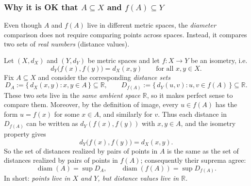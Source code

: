 
\subsubsection*{Why it is OK that $A\subseteq X$ and $f(A)\subseteq Y$}
Even though $A$ and $f(A)$ live in different metric spaces, the \emph{diameter}
comparison does not require comparing points across spaces.  Instead, it compares
two sets of \emph{real numbers} (distance values).

Let $(X,d_X)$ and $(Y,d_Y)$ be metric spaces and let $f:X\to Y$ be an isometry, i.e.
\[
d_Y\bigl(f(x),f(y)\bigr)=d_X(x,y)\qquad\text{for all }x,y\in X.
\]
Fix $A\subseteq X$ and consider the corresponding \emph{distance sets}
\[
D_A := \{\, d_X(x,y) : x,y\in A \,\}\subseteq \mathbb{R},
\qquad
D_{f(A)} := \{\, d_Y(u,v) : u,v\in f(A) \,\}\subseteq \mathbb{R}.
\]
These two sets live in the \emph{same ambient space} $\mathbb{R}$, so it makes
perfect sense to compare them. Moreover, by the definition of image,
every $u\in f(A)$ has the form $u=f(x)$ for some $x\in A$, and similarly for $v$.
Thus each distance in $D_{f(A)}$ can be written as $d_Y(f(x),f(y))$ with $x,y\in A$,
and the isometry property gives
\[
d_Y\bigl(f(x),f(y)\bigr)=d_X(x,y).
\]
So the set of distances realized by pairs of points in $A$ is the same as the set of
distances realized by pairs of points in $f(A)$; consequently their suprema agree:
\[
\operatorname{diam}(A)=\sup D_A,
\qquad
\operatorname{diam}(f(A))=\sup D_{f(A)}.
\]
In short: \emph{points live in $X$ and $Y$, but distance values live in $\mathbb{R}$.}


